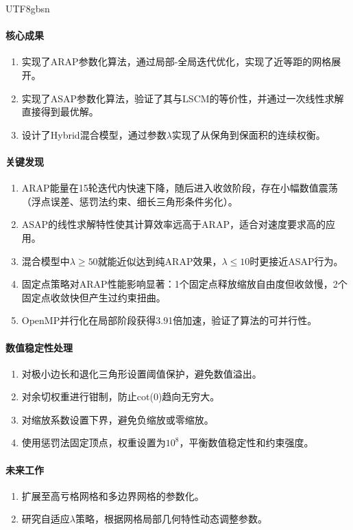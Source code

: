 \documentclass[10pt,a4paper,twocolumn]{article}
\begin{document}
\begin{CJK*}{UTF8}{gbsn}
\paragraph{核心成果}
\begin{enumerate}
\item 实现了ARAP参数化算法，通过局部-全局迭代优化，实现了近等距的网格展开。
\item 实现了ASAP参数化算法，验证了其与LSCM的等价性，并通过一次线性求解直接得到最优解。
\item 设计了Hybrid混合模型，通过参数$\lambda$实现了从保角到保面积的连续权衡。
\end{enumerate}

\paragraph{关键发现}
\begin{enumerate}
\item ARAP能量在15轮迭代内快速下降，随后进入收敛阶段，存在小幅数值震荡（浮点误差、惩罚法约束、细长三角形条件劣化）。
\item ASAP的线性求解特性使其计算效率远高于ARAP，适合对速度要求高的应用。
\item 混合模型中$\lambda\ge50$就能近似达到纯ARAP效果，$\lambda\le10$时更接近ASAP行为。
\item 固定点策略对ARAP性能影响显著：1个固定点释放缩放自由度但收敛慢，2个固定点收敛快但产生过约束扭曲。
\item OpenMP并行化在局部阶段获得3.91倍加速，验证了算法的可并行性。
\end{enumerate}

\paragraph{数值稳定性处理}
\begin{enumerate}
\item 对极小边长和退化三角形设置阈值保护，避免数值溢出。
\item 对余切权重进行钳制，防止cot(0)趋向无穷大。
\item 对缩放系数设置下界，避免负缩放或零缩放。
\item 使用惩罚法固定顶点，权重设置为$10^8$，平衡数值稳定性和约束强度。
\end{enumerate}

\paragraph{未来工作}
\begin{enumerate}
\item 扩展至高亏格网格和多边界网格的参数化。
\item 研究自适应$\lambda$策略，根据网格局部几何特性动态调整参数。
\end{enumerate}


\end{CJK*}
\end{document}

